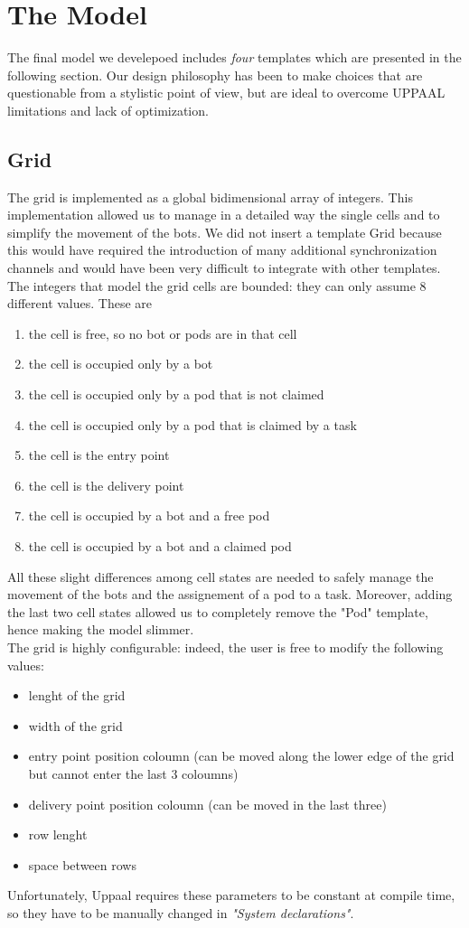 \documentclass{article}
\begin{document}
	\tableofcontents
	\clearpage
	
	\section{The Model}
		The final model we develepoed includes \emph{four} templates which are presented in the following section. Our design philosophy has been to make choices that are questionable from a stylistic point of view, but are ideal to overcome UPPAAL limitations and lack of optimization.
		\subsection{Grid}
			The grid is implemented as a global bidimensional array of integers. This implementation allowed us to manage in a detailed way the single cells and to simplify the movement of the bots. We did not insert a template Grid because this would have required the introduction of many additional synchronization channels and would have been very difficult to integrate with other templates.
			The integers that model the grid cells are bounded: they can only assume 8 different values. These are
			\begin{enumerate}[start=0, label={\arabic* :}]
				\item the cell is free, so no bot or pods are in that cell
				\item the cell is occupied only by a bot
				\item the cell is occupied only by a pod that is not claimed
				\item the cell is occupied only by a pod that is claimed by a task 
				\item the cell is the entry point 
				\item the cell is the delivery point
				\item the cell is occupied by a bot and a free pod
				\item the cell is occupied by a bot and a claimed pod
			\end{enumerate}
			All these slight differences among cell states are needed to safely manage the movement of the bots and the assignement of a pod to a task. Moreover, adding the last two cell states allowed us to completely remove the "Pod" template, hence making the model slimmer.\\
			The grid is highly configurable: indeed, the user is free to modify the following values:
			\begin{itemize}
				\item lenght of the grid
				\item width of the grid
				\item entry point position coloumn (can be moved along the lower edge of the grid but cannot enter the last 3 coloumns) 
				\item delivery point position coloumn (can be moved in the last three)
				\item row lenght
				\item space between rows
			\end{itemize}
			Unfortunately, Uppaal requires these parameters to be constant at compile time, so they have to be manually changed in \emph{"System declarations"}. 
			
\end{document}
